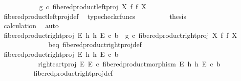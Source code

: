 \begin{isabellebody}
\ \ \ \ \ \ \isamarkupfalse%
\ \isamarkupfalse%
\ {\isachardoublequoteopen}{\isachardot}{\kern0pt}{\isachardot}{\kern0pt}{\isachardot}{\kern0pt}\ {\isacharequal}{\kern0pt}\ g\ {\isasymcirc}\isactrlsub c\ fibered{\isacharunderscore}{\kern0pt}product{\isacharunderscore}{\kern0pt}left{\isacharunderscore}{\kern0pt}proj\ X\ f\ f\ X{\isachardoublequoteclose}\isanewline
\ \ \ \ \ \ \ \ \isamarkupfalse%
\ fibered{\isacharunderscore}{\kern0pt}product{\isacharunderscore}{\kern0pt}left{\isacharunderscore}{\kern0pt}proj{\isacharunderscore}{\kern0pt}def\ \isamarkupfalse%
\ {\isacharparenleft}{\kern0pt}typecheck{\isacharunderscore}{\kern0pt}cfuncs{\isacharparenright}{\kern0pt}\isanewline
\ \ \ \ \ \ \isamarkupfalse%
\ \isamarkupfalse%
\ {\isacharquery}{\kern0pt}thesis\isanewline
\ \ \ \ \ \ \ \ \isamarkupfalse%
\ calculation\ \isamarkupfalse%
\ auto\isanewline
\ \ \ \ \isamarkupfalse%
\isanewline
\ \ \ \ \isamarkupfalse%
\ {\isachardoublequoteopen}fibered{\isacharunderscore}{\kern0pt}product{\isacharunderscore}{\kern0pt}right{\isacharunderscore}{\kern0pt}proj\ E\ h\ h\ E\ {\isasymcirc}\isactrlsub c\ b\ {\isacharequal}{\kern0pt}\ g\ {\isasymcirc}\isactrlsub c\ fibered{\isacharunderscore}{\kern0pt}product{\isacharunderscore}{\kern0pt}right{\isacharunderscore}{\kern0pt}proj\ X\ f\ f\ X{\isachardoublequoteclose}\isanewline
\ \ \ \ \isamarkupfalse%
\ {\isacharminus}{\kern0pt}\isanewline
\ \ \ \ \ \ \isamarkupfalse%
\ b{\isacharunderscore}{\kern0pt}eq\ fibered{\isacharunderscore}{\kern0pt}product{\isacharunderscore}{\kern0pt}right{\isacharunderscore}{\kern0pt}proj{\isacharunderscore}{\kern0pt}def\isanewline
\ \ \ \ \ \ \isamarkupfalse%
\ {\isachardoublequoteopen}fibered{\isacharunderscore}{\kern0pt}product{\isacharunderscore}{\kern0pt}right{\isacharunderscore}{\kern0pt}proj\ E\ h\ h\ E\ {\isasymcirc}\isactrlsub c\ b\isanewline
\ \ \ \ \ \ \ \ \ \ {\isacharequal}{\kern0pt}\ right{\isacharunderscore}{\kern0pt}cart{\isacharunderscore}{\kern0pt}proj\ E\ E\ {\isasymcirc}\isactrlsub c\ fibered{\isacharunderscore}{\kern0pt}product{\isacharunderscore}{\kern0pt}morphism\ E\ h\ h\ E\ {\isasymcirc}\isactrlsub c\ b{\isachardoublequoteclose}\isanewline
\ \ \ \ \ \ \ \ \isamarkupfalse%
\ fibered{\isacharunderscore}{\kern0pt}product{\isacharunderscore}{\kern0pt}right{\isacharunderscore}{\kern0pt}proj{\isacharunderscore}{\kern0pt}def\ \isamarkupfalse%

\end{isabellebody}
